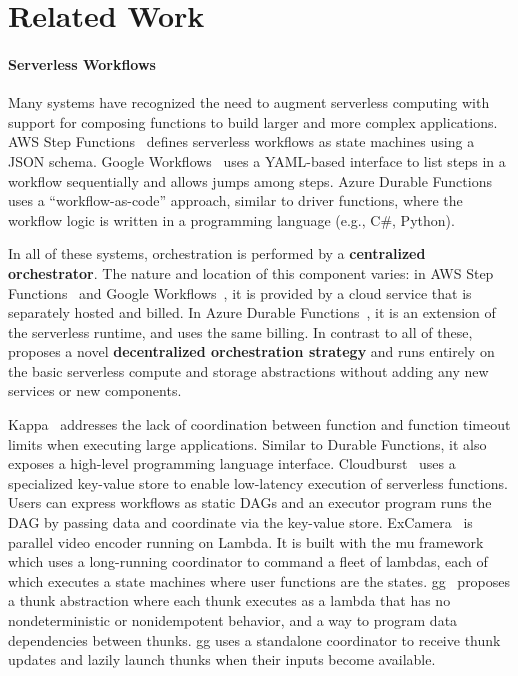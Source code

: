 \section{Related Work}\label{sec:related}

\paragraph{Serverless Workflows}

Many systems have recognized the need to augment serverless computing with
support for composing functions to build larger and more complex applications.
AWS Step Functions~\cite{aws-step-functions} defines serverless workflows as
state machines using a JSON schema. Google Workflows~\cite{google-workflows}
uses a YAML-based interface to list steps in a workflow sequentially and
allows jumps among steps. Azure Durable Functions~\cite{durable-functions}
uses a ``workflow-as-code'' approach, similar to driver functions, where the
workflow logic is written in a programming language (e.g., C\#, Python).


In all of these systems, orchestration is performed by a \textbf{centralized
orchestrator}. The nature and location of this component varies: in AWS Step
Functions~\cite{aws-step-functions} and Google
Workflows~\cite{google-workflows}, it is provided by a cloud service that is
separately hosted and billed. In Azure Durable
Functions~\cite{durable-functions}, it is an extension of the serverless
runtime, and uses the same billing. In contrast to all of these,
 \name{} proposes a novel \textbf{decentralized orchestration strategy} and
runs entirely on the basic serverless compute and storage abstractions without
adding any new services or new components.


Kappa~\cite{kappa} addresses the lack of coordination between function and
function timeout limits when executing large applications. Similar to Durable
Functions, it also exposes a high-level programming language interface.
Cloudburst~\cite{cloudburst} uses a specialized key-value store to enable
low-latency execution of serverless functions. Users can express workflows as
static DAGs and an executor program runs the DAG by passing data and
coordinate via the key-value store. ExCamera~\cite{excamera} is parallel video
encoder running on Lambda. It is built with the mu framework which uses a
long-running coordinator to command a fleet of lambdas, each of which executes
a state machines where user functions are the states. gg~\cite{gg-atc}
proposes a thunk abstraction where each thunk executes as a lambda that has no
nondeterministic or nonidempotent behavior, and a way to program data
dependencies between thunks. gg uses a standalone coordinator to receive thunk
updates and lazily launch thunks when their inputs become available.

